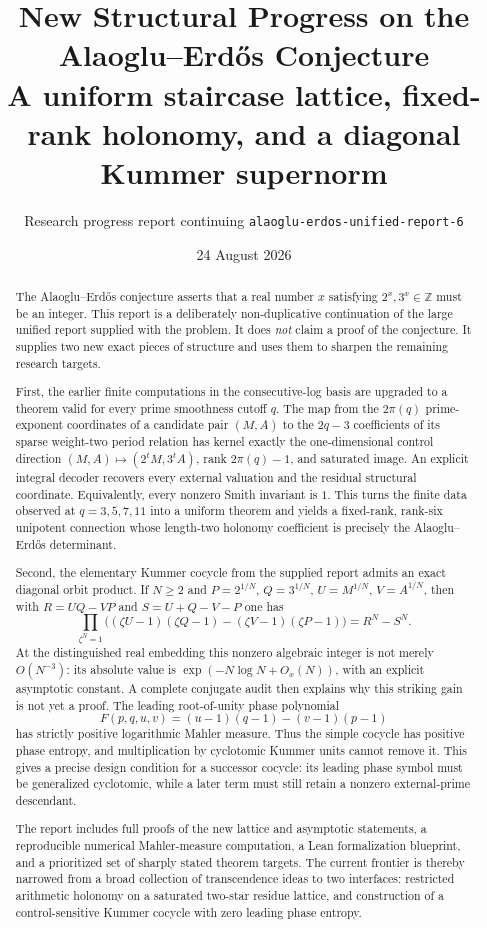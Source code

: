 \documentclass[11pt]{article}
\title{\textbf{New Structural Progress on the Alaoglu--Erd\H{o}s Conjecture}\\[0.35em]
\large A uniform staircase lattice, fixed-rank holonomy, and a diagonal Kummer supernorm}
\author{Research progress report continuing \texttt{alaoglu-erdos-unified-report-6}}
\date{24 August 2026}
\theoremstyle{definition}
\theoremstyle{remark}
\newcommand{\Z}{\mathbb Z}
\begin{document}
\maketitle

\begin{abstract}
The Alaoglu--Erd\H{o}s conjecture asserts that a real number $x$ satisfying
$2^x,3^x\in\Z$ must be an integer.  This report is a deliberately non-duplicative
continuation of the large unified report supplied with the problem.  It does
\emph{not} claim a proof of the conjecture.  It supplies two new exact pieces of
structure and uses them to sharpen the remaining research targets.

First, the earlier finite computations in the consecutive-log basis are upgraded
to a theorem valid for every prime smoothness cutoff $q$.  The map from the
$2\pi(q)$ prime-exponent coordinates of a candidate pair $(M,A)$ to the
$2q-3$ coefficients of its sparse weight-two period relation has kernel exactly
the one-dimensional control direction $(M,A)\mapsto(2^tM,3^tA)$, rank
$2\pi(q)-1$, and saturated image.  An explicit integral decoder recovers every
external valuation and the residual structural coordinate.  Equivalently, every
nonzero Smith invariant is $1$.  This turns the finite data observed at
$q=3,5,7,11$ into a uniform theorem and yields a fixed-rank, rank-six unipotent
connection whose length-two holonomy coefficient is precisely the
Alaoglu--Erd\H{o}s determinant.

Second, the elementary Kummer cocycle from the supplied report admits an exact
diagonal orbit product.  If $N\ge2$ and $P=2^{1/N}$, $Q=3^{1/N}$,
$U=M^{1/N}$, $V=A^{1/N}$, then with
$R=UQ-VP$ and $S=U+Q-V-P$ one has
\[
 \prod_{\zeta^N=1}
 \bigl((\zeta U-1)(\zeta Q-1)-(\zeta V-1)(\zeta P-1)\bigr)
 =R^N-S^N.
\]
At the distinguished real embedding this nonzero algebraic integer is not merely
$O(N^{-3})$: its absolute value is
$\exp(-N\log N+O_x(N))$, with an explicit asymptotic constant.  A complete
conjugate audit then explains why this striking gain is not yet a proof.  The
leading root-of-unity phase polynomial
\[
 F(p,q,u,v)=(u-1)(q-1)-(v-1)(p-1)
\]
has strictly positive logarithmic Mahler measure.  Thus the simple cocycle has
positive phase entropy, and multiplication by cyclotomic Kummer units cannot
remove it.  This gives a precise design condition for a successor cocycle: its
leading phase symbol must be generalized cyclotomic, while a later term must
still retain a nonzero external-prime descendant.

The report includes full proofs of the new lattice and asymptotic statements,
a reproducible numerical Mahler-measure computation, a Lean formalization
blueprint, and a prioritized set of sharply stated theorem targets.  The current
frontier is thereby narrowed from a broad collection of transcendence ideas to
two interfaces: restricted arithmetic holonomy on a saturated two-star residue
lattice, and construction of a control-sensitive Kummer cocycle with zero leading
phase entropy.
\end{abstract}
\end{document}
